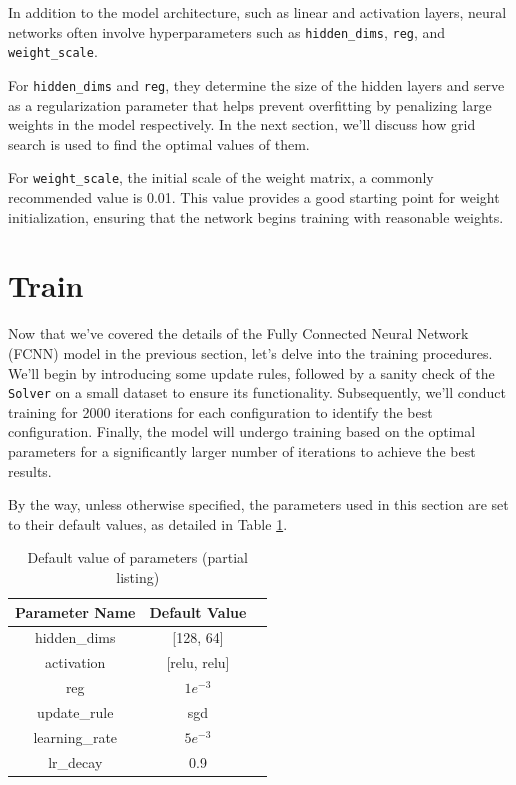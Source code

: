 \documentclass[10pt,a4paper,twoside]{tau}
\begin{document}
In addition to the model architecture, such as linear and activation layers, neural networks often involve hyperparameters such as \texttt{hidden\_dims}, \texttt{reg}, and \texttt{weight\_scale}. 

For \texttt{hidden\_dims} and \texttt{reg}, they determine the size of the hidden layers and serve as a regularization parameter that helps prevent overfitting by penalizing large weights in the model respectively. In the next section, we'll discuss how grid search is used to find the optimal values of them.

For \texttt{weight\_scale}, the initial scale of the weight matrix, a commonly recommended value is 0.01. This value provides a good starting point for weight initialization, ensuring that the network begins training with reasonable weights.



\section{Train}

Now that we've covered the details of the Fully Connected Neural Network (FCNN) model in the previous section, let's delve into the training procedures. We'll begin by introducing some update rules, followed by a sanity check of the \texttt{Solver} on a small dataset to ensure its functionality. Subsequently, we'll conduct training for 2000 iterations for each configuration to identify the best configuration. Finally, the model will undergo training based on the optimal parameters for a significantly larger number of iterations to achieve the best results.

By the way, unless otherwise specified, the parameters used in this section are set to their default values, as detailed in Table \ref{tab:parameters}.


\begin{table}[htbp]
    \centering
    \begin{tabular}{|c|c|c|}
        \hline
        \textbf{Parameter Name} & \textbf{Default Value} \\
        \hline
        hidden\_dims & [128, 64]  \\
        \hline
        activation & [relu, relu] \\
        \hline
        reg & $1e^{-3}$ \\
        \hline
        update\_rule & sgd \\
        \hline
        learning\_rate & $5e^{-3}$ \\
        \hline
        lr\_decay & 0.9 \\
        \hline
    \end{tabular}
    \caption{Default value of parameters (partial listing)}
    \label{tab:parameters}
\end{table}
\end{document}
